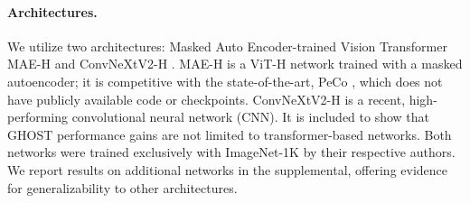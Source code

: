 \paragraph{Architectures.} We utilize two architectures: Masked Auto Encoder-trained Vision Transformer MAE-H \cite{he2022masked} and ConvNeXtV2-H \cite{woo2023convnext}.
MAE-H is a ViT-H network trained with a masked autoencoder; it is competitive with the state-of-the-art, PeCo \cite{dong2023peco}, which does not have publicly available code or checkpoints.
ConvNeXtV2-H is a recent, high-performing convolutional neural network (CNN). 
It is included to show that GHOST performance gains are not limited to transformer-based networks.
Both networks were trained exclusively with ImageNet-1K by their respective authors.
We report results on additional networks in the supplemental, offering evidence for generalizability to other architectures.



